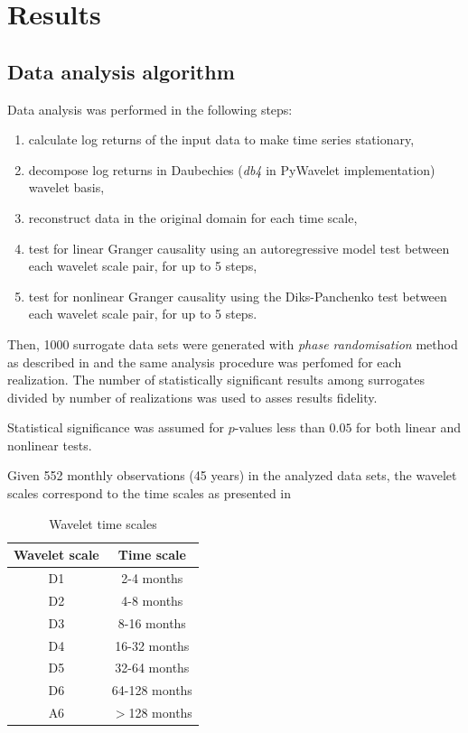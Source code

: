 \section{Results} \label{sec:results}

\subsection{Data analysis algorithm}

Data analysis was performed in the following steps:
\begin{enumerate}
\item calculate log returns of the input data to make time series stationary,
\item decompose log returns in Daubechies (\emph{db4} in PyWavelet implementation) wavelet basis,
\item reconstruct data in the original domain for each time scale,
\item test for linear Granger causality using an autoregressive model test between each wavelet scale pair, for up to 5 steps,
\item test for nonlinear Granger causality using the Diks-Panchenko test between each wavelet scale pair, for up to 5 steps.
\end{enumerate}

Then, 1000 surrogate data sets were generated with \emph{phase randomisation} method as described in  and the same analysis procedure was perfomed for each realization.
The number of statistically significant results among surrogates divided by number of realizations was used to asses results fidelity.

Statistical significance was assumed for $p$-values less than $0.05$ for both linear and nonlinear tests.

Given 552 monthly observations (45 years) in the analyzed data sets, the wavelet scales correspond to the time scales as presented in  

\begin{table}[h]
\begin{center}
\begin{tabular}{c|c}
\hline\hline
Wavelet scale & Time scale \\
\hline
D1 & 2-4 months \\
D2 & 4-8 months \\
D3 & 8-16 months \\
D4 & 16-32 months \\
D5 & 32-64 months \\
D6 & 64-128 months \\
A6 & $>$128 months \\
\hline\hline
\end{tabular}
\end{center}
\caption{Wavelet time scales}
\label{tab:scales}
\end{table}

